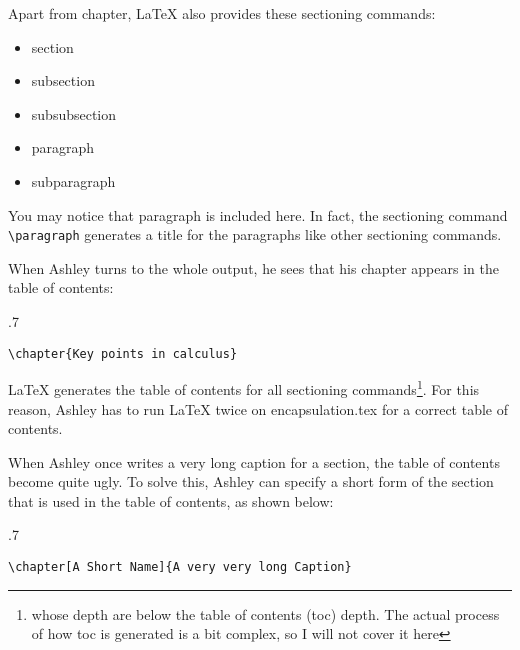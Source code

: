 Apart from chapter, \LaTeX{} also provides these sectioning commands:
\begin{itemize}
\item section
\item subsection
\item subsubsection
\item paragraph
\item subparagraph
\end{itemize}
You may notice that paragraph is included here. In fact, the sectioning command \verb=\paragraph= generates a title for the paragraphs like other sectioning commands.

When Ashley turns to the whole output, he sees that his chapter appears in the table of contents:

\begin{miniexammar}{.7\textandmarginlen}{
\faketoc
{}
}
\begin{lstlisting}
\chapter{Key points in calculus}
\end{lstlisting}
\end{miniexammar}
\LaTeX{} generates the table of contents for all sectioning commands\footnote{whose depth are below the table of contents (toc) depth. The actual process of how toc is generated is a bit complex, so I will not cover it here}. For this reason, Ashley has to run \LaTeX{} twice on encapsulation.tex for a correct table of contents.

When Ashley once writes a very long caption for a section, the table of contents become quite ugly. To solve this, Ashley can specify a short form of the section that is used in the table of contents, as shown below:
\begin{miniexammar}{.7\textandmarginlen}{
\faketoc
{}
}
\begin{lstlisting}
\chapter[A Short Name]{A very very long Caption}
\end{lstlisting}
\end{miniexammar}

